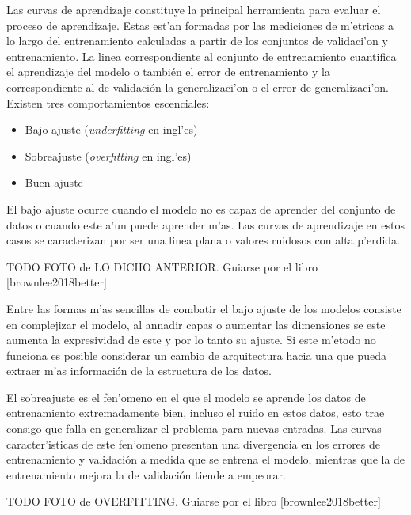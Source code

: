 Las curvas de aprendizaje constituye la principal herramienta para evaluar el proceso de aprendizaje.
Estas est'an formadas por las mediciones de m'etricas a lo largo del entrenamiento calculadas a partir de 
los conjuntos de validaci'on y entrenamiento. La linea correspondiente al conjunto de entrenamiento cuantifica 
el aprendizaje del modelo o también el error de entrenamiento y la correspondiente al de validación la 
generalizaci'on o el error de generalizaci'on. Existen tres comportamientos escenciales:

\begin{itemize}
	\item Bajo ajuste (\emph{underfitting} en ingl'es)
	\item Sobreajuste (\emph{overfitting} en ingl'es)
	\item Buen ajuste
\end{itemize}

El bajo ajuste ocurre cuando el modelo no es capaz de aprender del conjunto de datos o cuando este a'un puede aprender 
m'as. Las curvas de aprendizaje en estos casos se caracterizan por ser una linea plana o valores ruidosos con alta p'erdida.

TODO FOTO de LO DICHO ANTERIOR. Guiarse por el libro [brownlee2018better]

Entre las formas m'as sencillas de combatir el bajo ajuste de los modelos consiste en complejizar el modelo, al annadir
capas o aumentar las dimensiones se este aumenta la expresividad de este y por lo tanto su ajuste. Si este m'etodo 
no funciona es posible considerar un cambio de arquitectura hacia una que pueda extraer m'as información de la 
estructura de los datos. 

El sobreajuste es el fen'omeno en el que el modelo se aprende los datos de entrenamiento extremadamente bien, incluso
el ruido en estos datos, esto trae consigo que falla en generalizar el problema para nuevas entradas. Las curvas 
caracter'isticas de este fen'omeno presentan una divergencia en los errores de entrenamiento y validación a medida
que se entrena el modelo, mientras que la de entrenamiento mejora la de validación tiende a empeorar. 

TODO FOTO de OVERFITTING. Guiarse por el libro [brownlee2018better]


